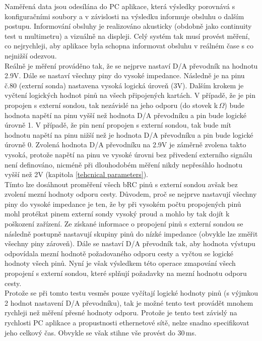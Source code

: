 Naměřená data jsou odesílána do PC aplikace, která výsledky porovnává
s konfiguračními soubory a v závislosti na výsledku informuje obsluhu o dalším postupu.
Informování obsluhy je realizováno akusticky (obdobně jako continuity test u multimetru)
a vizuálně na displeji. Celý systém tak musí provést měření, co nejrychleji, aby aplikace byla schopna informovat
obsluhu v reálném čase s co nejnižší odezvou.\\

Reálně je měření prováděno tak, že se nejprve nastaví D/A převodník na hodnotu 2.9V.
Dále se nastaví všechny piny do vysoké impedance. Následně je na pinu č.80 (externí sonda) nastavena vysoká logická úroveň (3V).
Dalším krokem je vyčtení logických hodnot pinů na všech připojených kartách. V případě, že je pin propojen s externí sondou,
tak nezávislé na jeho odporu (do stovek k\,$\Omega$) bude hodnota napětí na pinu vyšší než hodnota D/A převodníku a pin
bude logické úrovně 1. V případě, že pin není propojen s externí sondou, tak bude mít hodnotu napětí na pinu nižší než je hodnota
D/A převodníku a pin bude logické úrovně 0. Zvolená hodnota D/A převodníku na 2.9V je záměrně zvolena takto vysoká, protože
napětí na pinu ve vysoké úrovni bez přivedení externího signálu není definováno, nicméně při dlouhodobém měření nikdy nepřesáhlo
hodnotu vyšší než 2V (kapitola \ref{tehcnical parameters}).\\

Tímto lze dosáhnout proměření všech bRC pinů s externí sondou avšak bez zvolení mezní hodnoty odporu cesty. Důvodem,
proč se nejprve nastavují všechny piny do vysoké impedance je ten, že by při vysokém počtu propojených pinů mohl protékat
pinem externí sondy vysoký proud a mohlo by tak dojít k poškození zařízení. Ze získané informace o propojení pinů s externí sondou
se následně postupně nastavují skupiny pinů do nízké impedance (obvykle lze změřit všechny piny zároveň). Dále se nastaví D/A převodník
tak, aby hodnota výstupu odpovídala mezní hodnotě požadovaného odporu cesty a vyčtou se logické hodnoty všech pinů.
Nyní je však výsledkem této operace zmapování všech propojení s externí sondou, které splňují požadavky na mezní hodnotu odporu cesty.\\

Protože se při tomto testu vesměs pouze vyčítají logické hodnoty pinů (s výjmkou 2 hodnot nastavení D/A převodníku),
tak je možné tento test provádět mnohem rychleji než měření přesné hodnoty odporu. Protože je tento test závislý na rychlosti PC aplikace
a propustnosti ethernetové sítě, nelze snadno specifikovat jeho celkový čas. Obvykle se však stihne vše provést do 30\,ms.\\


